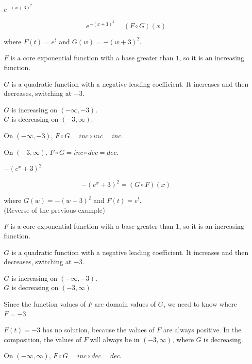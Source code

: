 \documentclass{ximera}
\begin{document}
\begin{example}   $e^{-(x+3)^2}$


\[  e^{-(x+3)^2}   = (F \circ G)(x)\]

where $F(t) = e^t$ and $G(w) = -(w+3)^2$.


$F$ is a core exponential function with a base greater than $1$, so it is an increasing function.


$G$ is a quadratic function with a negative leading coefficient. It increases and then decreases, switching at $-3$.

$G$ is increasing on $(-\infty, -3)$.\\
$G$ is decreasing on $(-3, \infty)$.



On $(-\infty, -3)$, $F \circ G = inc \circ inc = inc$.

On $(-3, \infty)$, $F \circ G = inc \circ dec = dec$.






\end{example}












\begin{example}   $-(e^x+3)^2$


\[  -(e^x+3)^2   = (G \circ F)(x)\]

where $G(w) = -(w+3)^2$ and $F(t) = e^t$.\\
(Reverse of the previous example)


$F$ is a core exponential function with a base greater than $1$, so it is an increasing function.


$G$ is a quadratic function with a negative leading coefficient. It increases and then decreases, switching at $-3$.

$G$ is increasing on $(-\infty, -3)$.\\
$G$ is decreasing on $(-3, \infty)$.


Since the function values of $F$ are domain values of $G$, we need to know where $F = -3$.

$F(t) = -3$ has no solution, because the values of $F$ are always positive. In the composition, the values of $F$ will always be in $(-3, \infty)$, where $G$ is decreasing.



On $(-\infty, \infty)$, $F \circ G = inc \circ dec = dec$.








\end{example}
\end{document}
